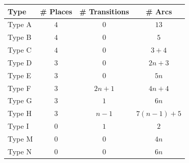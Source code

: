 \begin{tabular}{l|ccc}
    \toprule
    Type   & \# Places & \# Transitions & \# Arcs \\
    \midrule
    Type A & $4$ & $0$    & $13$       \\
    Type B & $4$ & $0$    & $5$        \\
    Type C & $4$ & $0$    & $3+4$      \\
    Type D & $3$ & $0$    & $2n+3$     \\
    Type E & $3$ & $0$    & $5n$       \\
    Type F & $3$ & $2n+1$ & $4n+4$     \\
    Type G & $3$ & $1$    & $6n$       \\
    Type H & $3$ & $n-1$  & $7(n-1)+5$ \\
    \midrule
    Type I & $0$ & $1$    & $2$        \\
    \midrule
    Type M & $0$ & $0$    & $4n$       \\
    Type N & $0$ & $0$    & $6n$       \\
    \bottomrule
\end{tabular}%
